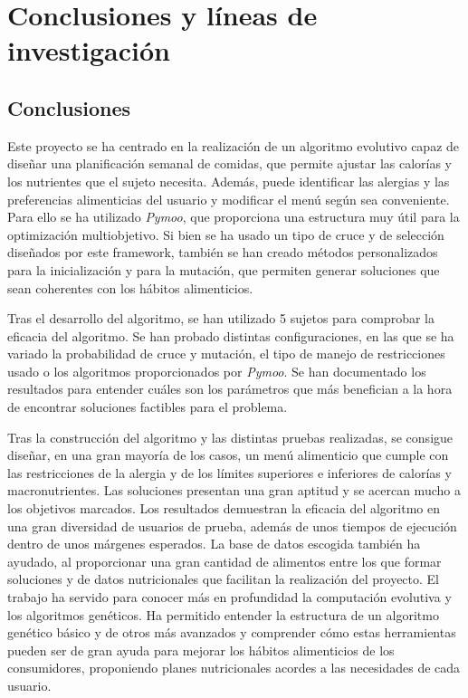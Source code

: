 \chapter{Conclusiones y líneas de investigación}
\label{ch:conclusiones}

\section{Conclusiones}
Este proyecto se ha centrado en la realización de un algoritmo evolutivo capaz de diseñar una planificación semanal de comidas, que permite ajustar las calorías y los nutrientes que el sujeto necesita. Además, puede identificar las alergias y las preferencias alimenticias del usuario y modificar el menú según sea conveniente. Para ello se ha utilizado \textit{Pymoo}, que proporciona una estructura muy útil para la optimización multiobjetivo. Si bien se ha usado un tipo de cruce y de selección diseñados por este framework, también se han creado métodos personalizados para la inicialización y para la mutación, que permiten generar soluciones que sean coherentes con los hábitos alimenticios.

Tras el desarrollo del algoritmo, se han utilizado 5 sujetos para comprobar la eficacia del algoritmo. Se han probado distintas configuraciones, en las que se ha variado la probabilidad de cruce y mutación, el tipo de manejo de restricciones usado o los algoritmos proporcionados por \textit{Pymoo}. Se han documentado los resultados para entender cuáles son los parámetros que más benefician a la hora de encontrar soluciones factibles para el problema.

Tras la construcción del algoritmo y las distintas pruebas realizadas, se consigue diseñar, en una gran mayoría de los casos, un menú alimenticio que cumple con las restricciones de la alergia y de los límites superiores e inferiores de calorías y macronutrientes. Las soluciones presentan una gran aptitud y se acercan mucho a los objetivos marcados. Los resultados demuestran la eficacia del algoritmo en una gran diversidad de usuarios de prueba, además de unos tiempos de ejecución dentro de unos márgenes esperados. La base de datos escogida también ha ayudado, al proporcionar una gran cantidad de alimentos entre los que formar soluciones y de datos nutricionales que facilitan la realización del proyecto.
\newpage
El trabajo ha servido para conocer más en profundidad la computación evolutiva y los algoritmos genéticos. Ha permitido entender la estructura de un algoritmo genético básico y de otros más avanzados y comprender cómo estas herramientas pueden ser de gran ayuda para mejorar los hábitos alimenticios de los consumidores, proponiendo planes nutricionales acordes a las necesidades de cada usuario.

